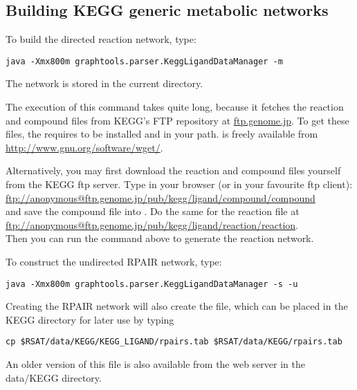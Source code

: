 \subsection{Building KEGG generic metabolic networks} 

To build the directed reaction network, type:

\begin{verbatim}
java -Xmx800m graphtools.parser.KeggLigandDataManager -m
\end{verbatim}

The network is stored in the current directory.

The execution of this command takes quite long, because it fetches the reaction
and compound files from KEGG's FTP repository at \url{ftp.genome.jp}. 
To get these files, the  requires
 to be installed and in your path.  is 
freely available from \url{http://www.gnu.org/software/wget/}.

Alternatively, you may first download the reaction and compound files yourself
from the KEGG ftp server. Type in your browser (or in your favourite ftp
client):\\
\url{ftp://anonymous@ftp.genome.jp/pub/kegg/ligand/compound/compound}\\
and save the compound file into \RSAT{}. Do the same
for the reaction file at\\
\url{ftp://anonymous@ftp.genome.jp/pub/kegg/ligand/reaction/reaction}.\\ 
Then you can run the command above to generate the reaction network.

To construct the undirected RPAIR network, type:

\begin{verbatim}
java -Xmx800m graphtools.parser.KeggLigandDataManager -s -u
\end{verbatim}

Creating the RPAIR network will also create the  file, which
can be placed in the KEGG directory for later use by typing

\begin{lstlisting}
cp $RSAT/data/KEGG/KEGG_LIGAND/rpairs.tab $RSAT/data/KEGG/rpairs.tab
\end{lstlisting}

An older version of this file is also available from the \neat web server
in the data/KEGG directory.

